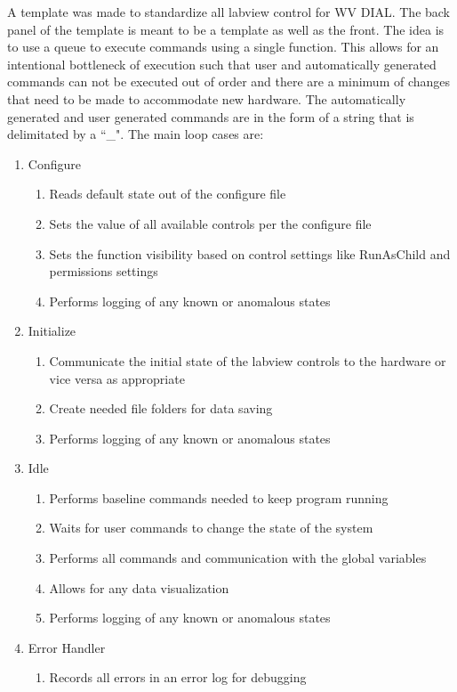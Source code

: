 A template was made to standardize all labview control for WV DIAL. The back panel of the template is meant to be a template as well as the front. The idea is to use a queue to execute commands using a single function. This allows for an intentional bottleneck of execution such that user and automatically generated commands can not be executed out of order and there are a minimum of changes that need to be made to accommodate new hardware. The automatically generated and user generated commands are in the form of a string that is delimitated by a ``\_". The main loop cases are:
\begin{enumerate}
	\item{Configure}
	\begin{enumerate}
		\item{Reads default state out of the configure file}
		\item{Sets the value of all available controls per the configure file}
		\item{Sets the function visibility based on control settings like RunAsChild and permissions settings}
		\item{Performs logging of any known or anomalous states}
	\end{enumerate}
	\item{Initialize}
	\begin{enumerate}
		\item{Communicate the initial state of the labview controls to the hardware or vice versa as appropriate}
		\item{Create needed file folders for data saving}
		\item{Performs logging of any known or anomalous states}
	\end{enumerate}
	\item{Idle}
	\begin{enumerate}
		\item{Performs baseline commands needed to keep program running}
		\item{Waits for user commands to change the state of the system}
		\item{Performs all commands and communication with the global variables}
		\item{Allows for any data visualization}
		\item{Performs logging of any known or anomalous states}
	\end{enumerate}
	\item{Error Handler}
	\begin{enumerate}
		\item{Records all errors in an error log for debugging}

\end{enumerate}
\end{enumerate}
